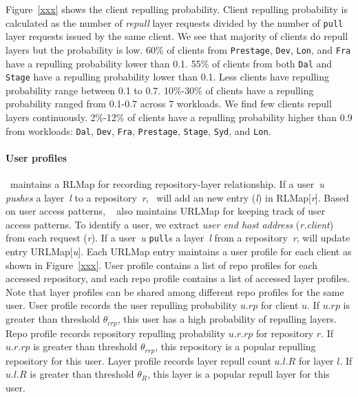 Figure~\ref{xxx} shows the client repulling probability.
Client repulling probability is calculated as the number of \emph{repull} layer requests divided by
the number of \texttt{pull} layer requests issued by the same client.
We see that majority of clients do repull layers but the probability is low.
60\% of clients from \texttt{Prestage}, \texttt{Dev}, \texttt{Lon}, and \texttt{Fra} have a repulling probability lower than 0.1.
55\% of clients from both \texttt{Dal} and \texttt{Stage} have a repulling probability lower than 0.1.
Less clients have repulling probability range between 0.1 to 0.7.
10\%-30\% of clients have a repulling probability ranged from 0.1-0.7 across 7 workloads.
We find few clients repull layers continuously.
2\%-12\% of clients have a repulling probability higher than 0.9 from workloads:
\texttt{Dal}, \texttt{Dev}, \texttt{Fra}, \texttt{Prestage},
\texttt{Stage}, \texttt{Syd}, and \texttt{Lon}.

\paragraph{User profiles}

\preconstructcachename~maintains a RLMap for recording repository-layer relationship.
If a user~\emph{u} \emph{pushes} a  layer~\emph{l} to a repository~\emph{r},
\preconstructcachename~will add an new entry (\emph{l}) in RLMap[\emph{r}]. 
Based on user access patterns,
\preconstructcachename~ also maintains URLMap for keeping track of user access patterns.
To identify a user, 
we extract \emph{user end host address} (\emph{r.client}) from each request (\emph{r}). 
If a user~\emph{u} \texttt{pull}s a layer~\emph{l} from a repository~\emph{r},
\preconstructcachename will update entry URLMap[\emph{u}].
Each URLMap entry maintains a user profile for each client as shown in Figure~\ref{xxx}.
User profile contains a list of repo profiles for each accessed repository,
and each repo profile contains a list of accessed layer profiles.
Note that layer profiles can be shared among different repo profiles for the same user.
User profile records the user repulling probability $u.rp$ for client $u$.
If $u.rp$ is greater than threshold $\theta_{crp}$, this user has a high probability of repulling layers.
Repo profile records repository repulling probability $u.r.rp$ for repository $r$.
If $u.r.rp$ is greater than threshold $\theta_{rrp}$, this repository is a popular repulling repository for this user.
Layer profile records layer repull count $u.l.R$ for layer $l$.
If $u.l.R$ is greater than threshold $\theta_{R}$, this layer is a popular repull layer for this user.

